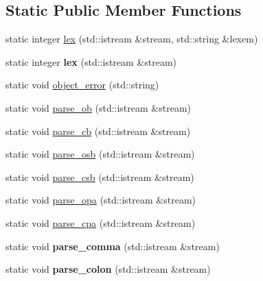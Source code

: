 \subsection*{Static Public Member Functions}
\begin{DoxyCompactItemize}
\item 
static integer \hyperlink{classez_1_1objects_1_1ObjectSerializer_a35016a821006ca66f92a38f5fd686cab}{lex} (std\+::istream \&stream, std\+::string \&lexem)
\item 
\mbox{\label{classez_1_1objects_1_1ObjectSerializer_a5b07fe9acf0b1cab4f409951e2d3e82c}} 
static integer {\bfseries lex} (std\+::istream \&stream)
\item 
static void \hyperlink{classez_1_1objects_1_1ObjectSerializer_a4fd0c72f3d2402f1c5fc764c577ff014}{object\+\_\+error} (std\+::string)
\item 
static void \hyperlink{classez_1_1objects_1_1ObjectSerializer_ae0095f6fcfbeb5b0aaf98d3f1b355f45}{parse\+\_\+ob} (std\+::istream \&stream)
\item 
static void \hyperlink{classez_1_1objects_1_1ObjectSerializer_a6afc5c5fc7eb99ed2fec22a99b01dd44}{parse\+\_\+cb} (std\+::istream \&stream)
\item 
static void \hyperlink{classez_1_1objects_1_1ObjectSerializer_a4935aafbceb01000ea63ce77ce216ceb}{parse\+\_\+osb} (std\+::istream \&stream)
\item 
static void \hyperlink{classez_1_1objects_1_1ObjectSerializer_af1df61d63076f1f47629162bdd344ff0}{parse\+\_\+csb} (std\+::istream \&stream)
\item 
static void \hyperlink{classez_1_1objects_1_1ObjectSerializer_aff1ebd4f37272cac1fdc3bfa11311d66}{parse\+\_\+opa} (std\+::istream \&stream)
\item 
static void \hyperlink{classez_1_1objects_1_1ObjectSerializer_af90884b54943ccd2f17a2ac9cfd8bfc1}{parse\+\_\+cpa} (std\+::istream \&stream)
\item 
\mbox{\label{classez_1_1objects_1_1ObjectSerializer_a8f2bc86818e9164db8c8cfc7f4090bd4}} 
static void {\bfseries parse\+\_\+comma} (std\+::istream \&stream)
\item 
\mbox{\label{classez_1_1objects_1_1ObjectSerializer_aab94a7535a07e4872aaf236e8c5af62e}} 
static void {\bfseries parse\+\_\+colon} (std\+::istream \&stream)

\end{DoxyCompactItemize}
